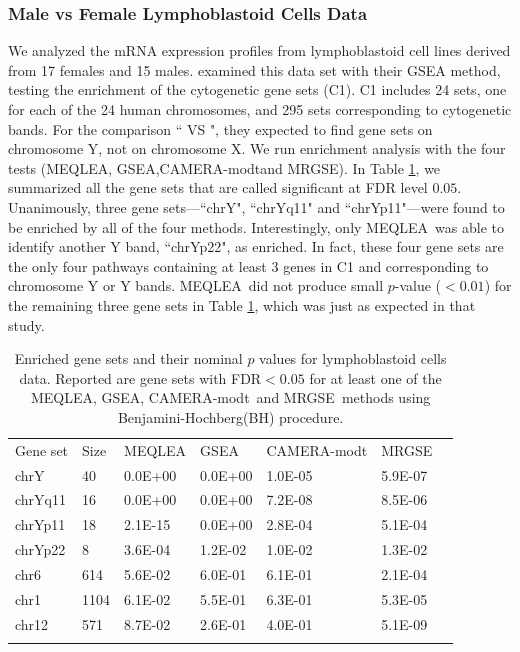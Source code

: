 \documentclass[a4,center,fleqn]{NAR}
\newcommand{\OurMethod}{MEQLEA}
\newcommand{\CMT}{CAMERA-modt}
\newcommand{\genr}{MRGSE}
\newcommand{\FDR}{Benjamini-Hochberg}
\newcommand{\FDRabb}{BH}
\begin{document}
	\subsubsection{Male vs Female Lymphoblastoid Cells Data}
	We analyzed the mRNA expression profiles from lymphoblastoid cell lines derived from 17 females and
	15 males. \citet{subramanian2005gene} examined this data set with their GSEA method, testing the
	enrichment of the  cytogenetic gene sets (C1). C1 includes 24 sets, one for each of the 24 human
	chromosomes, and 295 sets corresponding to cytogenetic bands. For the comparison `` VS
	", they expected to find gene sets on chromosome Y, not on chromosome X. We run
	enrichment analysis with the four tests (\OurMethod, GSEA,\CMT and \genr). In Table
	\ref{table:gender}, we summarized all the gene sets that are called significant at FDR level $0.05$.
	Unanimously, three gene sets---``chrY", ``chrYq11" and ``chrYp11"---were found to be enriched by all
	of the four methods. Interestingly, only \OurMethod~was able to identify another Y band, ``chrYp22",
	as enriched. In fact, these four gene sets are the only four pathways containing at least 3 genes in
	C1 and corresponding to chromosome Y or Y bands. \OurMethod~did not produce small $p$-value ($<
	0.01$) for the remaining three gene sets in Table \ref{table:gender}, which was just as expected in
	that study.
	
	\begin{table}[!ht]
		\centering
		\caption{Enriched gene sets and their nominal $p$ values for lymphoblastoid cells data. Reported
			are gene sets with FDR$<0.05$ for at least one of the \OurMethod, GSEA, \CMT~and \genr~methods using
			\FDR(\FDRabb) procedure.}
		\begin{tabular}{p{2cm}p{1cm}p{2cm}p{2cm}p{3cm}p{2cm}p{0.5cm}} \toprule
			Gene set & Size & \OurMethod & GSEA & \CMT & \genr \\ 		\colrule
			chrY & 40 & 0.0E+00 & 0.0E+00 & 1.0E-05 & 5.9E-07 \\ 
			chrYq11 & 16 & 0.0E+00 & 0.0E+00 & 7.2E-08 & 8.5E-06 \\ 
			chrYp11 & 18 & 2.1E-15 & 0.0E+00 & 2.8E-04 & 5.1E-04 \\ 
			chrYp22 & 8 & 3.6E-04 & 1.2E-02 & 1.0E-02 & 1.3E-02 \\ 
			chr6 & 614 & 5.6E-02 & 6.0E-01 & 6.1E-01 & 2.1E-04 \\ 
			chr1 & 1104 & 6.1E-02 & 5.5E-01 & 6.3E-01 & 5.3E-05 \\ 
			chr12 & 571 & 8.7E-02 & 2.6E-01 & 4.0E-01 & 5.1E-09 \\ 
			\botrule
		\end{tabular}
		\label{table:gender}
	\end{table}
	
\end{document}
